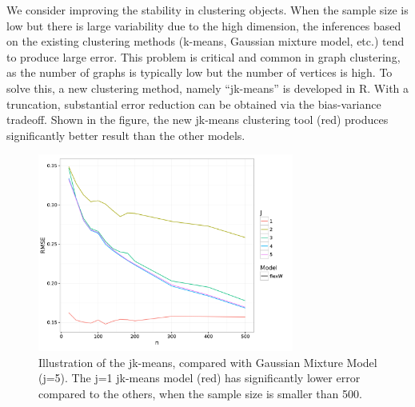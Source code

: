 \documentclass[simplex.tex]{subfiles}
\begin{document}
We consider improving the stability in clustering objects. When the
sample size is low but there is large variability due to the high
dimension, the inferences based on the existing clustering methods
(k-means, Gaussian mixture model, etc.) tend to produce large error.
This problem is critical and common in graph clustering, as the number
of graphs is typically low but the number of vertices is high. To solve
this, a new clustering method, namely ``jk-means'' is developed in R.
With a truncation, substantial error reduction can be obtained via the
bias-variance tradeoff. Shown in the figure, the new jk-means clustering
tool (red) produces significantly better result than the other models.


\begin{figure}[h!]
\begin{cframed}
\centering
\includegraphics[width=0.75\textwidth]{./figs/jkmeans.png}
\caption{
Illustration of the jk-means, compared with Gaussian Mixture Model (j=5). The j=1 jk-means model (red) has significantly lower error compared to the others, when the sample size is smaller than 500.
}
\label{fig:jkmeans}
\end{cframed}
\end{figure}
\end{document}
